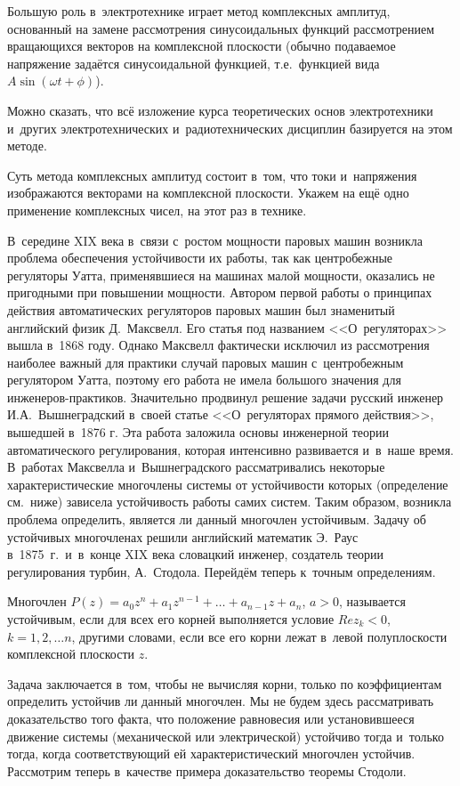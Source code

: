 Большую роль в~электротехнике играет метод комплексных амплитуд, основанный
на замене рассмотрения синусоидальных функций рассмотрением вращающихся
векторов на комплексной плоскости (обычно подаваемое напряжение задаётся
синусоидальной функцией, т.е.\ функцией вида $A \sin (\omega t + \phi)$).

Можно сказать, что всё изложение курса теоретических основ электротехники
и~других электротехнических и~радиотехнических дисциплин базируется на
этом методе.

Суть метода комплексных амплитуд состоит в~том, что токи и~напряжения
изображаются векторами на комплексной плоскости. Укажем на ещё одно
применение комплексных чисел, на этот раз в технике.

В~середине XIX века в~связи с~ростом мощности паровых машин возникла
проблема обеспечения устойчивости их работы, так как центробежные регуляторы
Уатта, применявшиеся на машинах малой мощности, оказались не пригодными
при повышении мощности. Автором первой работы о принципах действия
автоматических регуляторов паровых машин был знаменитый английский физик
Д.~Максвелл. Его статья под названием <<О~регуляторах>> вышла в~1868 году.
Однако Максвелл фактически исключил из рассмотрения наиболее важный для
практики случай паровых машин с~центробежным регулятором Уатта, поэтому
его работа не имела большого значения для инженеров-практиков. Значительно
продвинул решение задачи русский инженер И.А.~Вышнеградский в~своей статье
<<О~регуляторах прямого действия>>, вышедшей в~1876 г. Эта работа заложила
основы инженерной теории автоматического регулирования, которая интенсивно
развивается и~в~наше время. В~работах Максвелла и~Вышнеградского
рассматривались некоторые характеристические многочлены системы от
устойчивости которых (определение см.\ ниже) зависела устойчивость работы
самих систем. Таким образом, возникла проблема определить, является ли данный
многочлен устойчивым. Задачу об устойчивых многочленах решили английский
математик Э.~Раус в~1875~г.\ и~в~конце XIX века словацкий инженер, создатель
теории регулирования турбин, А.~Стодола.
Перейдём теперь к~точным определениям.

Многочлен 
$P(z) = a_{0}z^{n} + a_{1}z^{n-1} + \dots + a_{n-1}z + a_{n}$, $a > 0$,
называется устойчивым, если для всех его корней выполняется условие
$Re z_{k} < 0$, $k = 1, 2, \dots n$, другими словами, если все его корни
лежат в~левой полуплоскости комплексной плоскости $z$.

Задача заключается в~том, чтобы не вычисляя корни, только по коэффициентам
определить устойчив ли данный многочлен. Мы не будем здесь рассматривать
доказательство того факта, что положение равновесия или установившееся
движение системы (механической или электрической) устойчиво тогда и~только
тогда, когда соответствующий ей характеристический многочлен устойчив.
Рассмотрим теперь в~качестве примера доказательство теоремы Стодоли.

